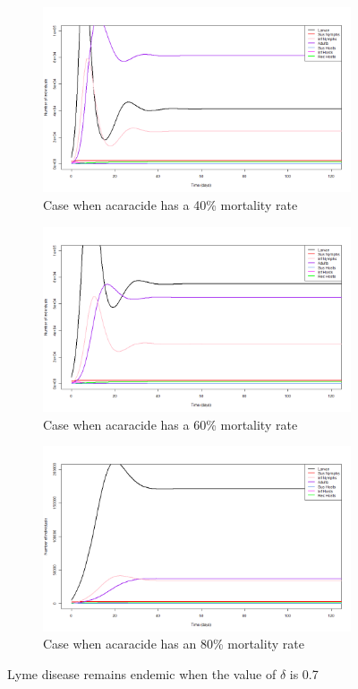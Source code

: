 \documentclass[12pt, centerh1]{article}
\begin{document}
\begin{figure}[h!]
\begin{subfigure}{\textwidth}
    \centering
    \includegraphics[scale = 0.28]{figures/intervention_40.png}
    \caption{Case when acaracide has a 40\% mortality rate}
\end{subfigure}
\begin{subfigure}{\textwidth}
    \centering
    \includegraphics[scale = 0.28]{figures/intervention_60.png}
    \caption{Case when acaracide has a 60\% mortality rate}
\end{subfigure}
\begin{subfigure}{\textwidth}
    \centering
    \includegraphics[scale = 0.28]{figures/intervention_endemic.png}
    \caption{Case when acaracide has an 80\% mortality rate}
\end{subfigure}
\caption{Lyme disease remains endemic when the value of $\delta$ is 0.7}
\label{fig:endemic}
\end{figure}
\end{document}
